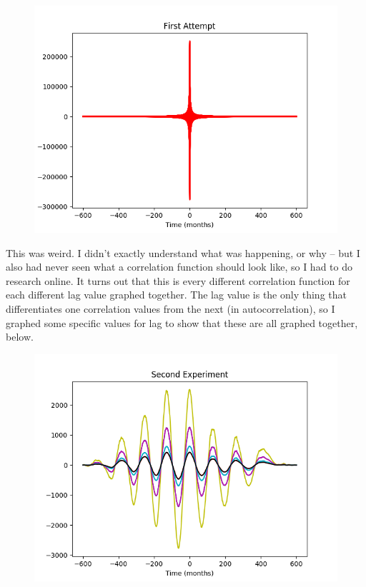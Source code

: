 \documentclass[12pt]{article}
\begin{document}
\begin{figure}[H]
\begin{center}
\includegraphics[scale=0.8]{first.png}
\end{center}
\end{figure}

This was weird. I didn't exactly understand what was happening, or why -- but I also had never seen what a correlation function should look like, so I had to do research online. It turns out that this is every different correlation function for each different lag value graphed together. The lag value is the only thing that differentiates one correlation values from the next (in autocorrelation), so I graphed some specific values for lag to show that these are all graphed together, below.


\begin{figure}[H]
\begin{center}
\includegraphics[scale=0.8]{second.png}
\end{center}
\end{figure}
\end{document}
